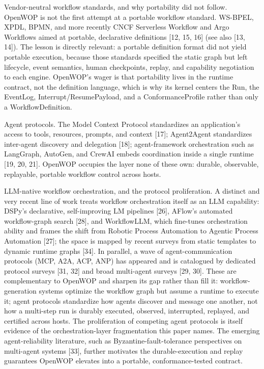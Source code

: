 \documentclass[11pt]{article}
\begin{document}
Vendor-neutral workflow standards, and why portability did not follow. OpenWOP is not the first attempt at a portable workflow standard. WS-BPEL, XPDL, BPMN, and more recently CNCF Serverless Workflow and Argo Workflows aimed at portable, declarative definitions [12, 15, 16] (see also [13, 14]). The lesson is directly relevant: a portable definition format did not yield portable execution, because those standards specified the static graph but left lifecycle, event semantics, human checkpoints, replay, and capability negotiation to each engine. OpenWOP's wager is that portability lives in the runtime contract, not the definition language, which is why its kernel centers the Run, the EventLog, Interrupt/ResumePayload, and a ConformanceProfile rather than only a WorkflowDefinition.

Agent protocols. The Model Context Protocol standardizes an application's access to tools, resources, prompts, and context [17]; Agent2Agent standardizes inter-agent discovery and delegation [18]; agent-framework orchestration such as LangGraph, AutoGen, and CrewAI embeds coordination inside a single runtime [19, 20, 21]. OpenWOP occupies the layer none of these own: durable, observable, replayable, portable workflow control across hosts.

LLM-native workflow orchestration, and the protocol proliferation. A distinct and very recent line of work treats workflow orchestration itself as an LLM capability: DSPy's declarative, self-improving LM pipelines [26], AFlow's automated workflow-graph search [28], and WorkflowLLM, which fine-tunes orchestration ability and frames the shift from Robotic Process Automation to Agentic Process Automation [27]; the space is mapped by recent surveys from static templates to dynamic runtime graphs [34]. In parallel, a wave of agent-communication protocols (MCP, A2A, ACP, ANP) has appeared and is catalogued by dedicated protocol surveys [31, 32] and broad multi-agent surveys [29, 30]. These are complementary to OpenWOP and sharpen its gap rather than fill it: workflow-generation systems optimize the workflow graph but assume a runtime to execute it; agent protocols standardize how agents discover and message one another, not how a multi-step run is durably executed, observed, interrupted, replayed, and certified across hosts. The proliferation of competing agent protocols is itself evidence of the orchestration-layer fragmentation this paper names. The emerging agent-reliability literature, such as Byzantine-fault-tolerance perspectives on multi-agent systems [33], further motivates the durable-execution and replay guarantees OpenWOP elevates into a portable, conformance-tested contract.
\end{document}
